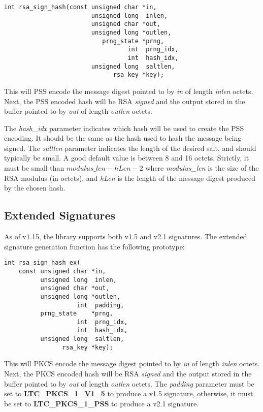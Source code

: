 \documentclass[synpaper]{book}
\begin{document}
\begin{verbatim}
int rsa_sign_hash(const unsigned char *in, 
                        unsigned long  inlen, 
                        unsigned char *out,  
                        unsigned long *outlen, 
                           prng_state *prng,     
                                  int  prng_idx,
                                  int  hash_idx, 
                        unsigned long  saltlen,
                              rsa_key *key);
\end{verbatim}

This will PSS encode the message digest pointed to by \textit{in} of length \textit{inlen} octets.  Next, the PSS encoded hash will be RSA 
\textit{signed} and the output stored in the buffer pointed to by \textit{out} of length \textit{outlen} octets.  

The \textit{hash\_idx} parameter indicates which hash will be used to create the PSS encoding.  It should be the same as the hash used to
hash the message being signed.  The \textit{saltlen} parameter indicates the length of the desired salt, and should typically be small.  A good
default value is between 8 and 16 octets.  Strictly, it must be small than $modulus\_len - hLen - 2$ where \textit{modulus\_len} is the size of
the RSA modulus (in octets), and \textit{hLen} is the length of the message digest produced by the chosen hash.  

\subsection{Extended Signatures}

As of v1.15, the library supports both v1.5 and v2.1 signatures.  The extended signature generation function has the following prototype:

\begin{verbatim}
int rsa_sign_hash_ex(
    const unsigned char *in,       
          unsigned long  inlen,
          unsigned char *out,      
          unsigned long *outlen,
                    int  padding,
          prng_state    *prng,     
                    int  prng_idx,
                    int  hash_idx, 
          unsigned long  saltlen,
                rsa_key *key);
\end{verbatim}

This will PKCS encode the message digest pointed to by \textit{in} of length \textit{inlen} octets.  Next, the PKCS encoded hash will be RSA 
\textit{signed} and the output stored in the buffer pointed to by \textit{out} of length \textit{outlen} octets.  The \textit{padding} parameter
must be set to \textbf{LTC\_PKCS\_1\_V1\_5} to produce a v1.5 signature, otherwise, it must be set to \textbf{LTC\_PKCS\_1\_PSS} to produce a 
v2.1 signature.
\end{document}
